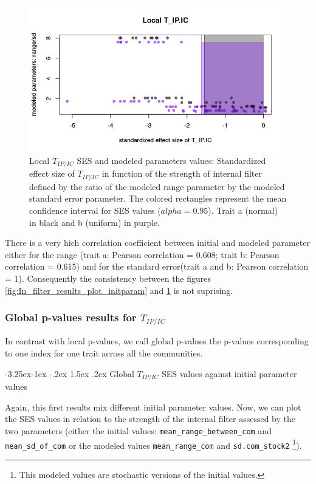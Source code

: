 \documentclass[12pt]{article}\usepackage[]{graphicx}\usepackage[]{color}
\makeatletter
\def\maxwidth{ %
  \ifdim\Gin@nat@width>\linewidth
    \linewidth
  \else
    \Gin@nat@width
  \fi
}
\newenvironment{knitrout}{}{} %
\newcounter {subsubsubsection}[subsubsection]
\newcommand\subsubsubsection{\@startsection{subsubsubsection}{4}{\z@}%
          {-3.25ex\@plus -1ex \@minus -.2ex}%
          {1.5ex \@plus .2ex}%
          {\normalfont\normalsize\bfseries}}
\makeatother
\begin{document}
\begin{knitrout}
\begin{figure}
{\centering \includegraphics[width=\maxwidth]{figure/In_filter_results_plot_modeledparam-1} 

}

\caption[Local $T_{IP/IC}$ SES and modeled parameters values]{Local $T_{IP/IC}$ SES and modeled parameters values: Standardized effect size of $T_{IP/IC}$ in function of the strength of internal filter defined by the ratio of the modeled range parameter by the modeled standard error parameter. The colored rectangles represent the mean confidence interval for SES values ($alpha = 0.95$). Trait a (normal) in black and b (uniform) in purple.}\label{fig:In_filter_results_plot_modeledparam}
\end{figure}


\end{knitrout}

There is a very hich correlation coefficient between initial and modeled parameter either for the range (trait a: Pearson correlation = 0.608; trait b: Pearson correlation = 0.615) and for the standard error(trait a and b: Pearson correlation = 1). Consequently the consistency between the figures \ref{fig:In_filter_results_plot_initparam} and  \ref{fig:In_filter_results_plot_modeledparam} is not suprising. 
 
 \subsubsection {Global p-values results for $T_{IP/IC}$}
In contrast with local p-values, we call global p-values the p-values corresponding to one index for one trait across all the communities. 

  \subsubsubsection {Global $T_{IP/IC}$ SES values against initial parameter values}
  
Again, this first results mix different initial parameter values. Now, we can plot the SES values in relation to the strength of the internal filter assessed by the two parameters (either the initial values: \texttt{mean\_{}range\_{}between\_{}com} and \texttt{mean\_{}sd\_{}of\_{}com} or the modeled values \texttt{mean\_{}range\_{}com} and \texttt{sd.com\_{}stock2} \footnote{This modeled values are stochastic versions of the initial values.}). 
\end{document}
